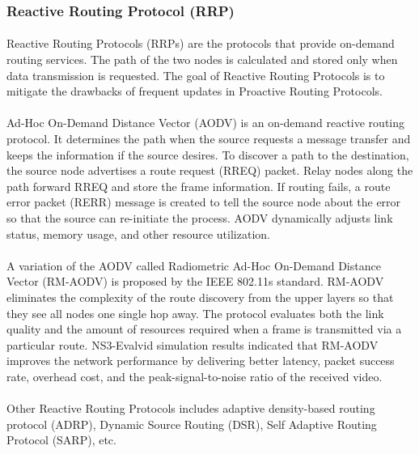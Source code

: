 \documentclass[a4paper,12pt]{report}
\begin{document}
\subsubsection{Reactive Routing Protocol (RRP)}
\paragraph{}
Reactive Routing Protocols (RRPs) are the protocols that provide on-demand routing services. The path of the two nodes is calculated and stored only when data transmission is requested. The goal of Reactive Routing Protocols is to mitigate the drawbacks of frequent updates in Proactive Routing Protocols.

\paragraph{}
Ad-Hoc On-Demand Distance Vector (AODV) is an on-demand reactive routing protocol. It determines the path when the source requests a message transfer and keeps the information if the source desires. To discover a path to the destination, the source node advertises a route request (RREQ) packet. Relay nodes along the path forward RREQ and store the frame information\cite{maurya2012overview}. If routing fails, a route error packet (RERR) message is created to tell the source node about the error so that the source can re-initiate the process. AODV dynamically adjusts link status, memory usage, and other resource utilization\cite{maurya2012overview}.

\paragraph{}
A variation of the AODV called Radiometric Ad-Hoc On-Demand Distance Vector (RM-AODV) is proposed by the IEEE 802.11s standard\cite{topobased}. RM-AODV eliminates the complexity of the route discovery from the upper layers so that they see all nodes one single hop away\cite{topobased}. The protocol evaluates both the link quality and the amount of resources required when a frame is transmitted via a particular route. NS3-Evalvid simulation results indicated that RM-AODV improves the network performance by delivering better latency, packet success rate, overhead cost, and the peak-signal-to-noise ratio of the received video\cite{katila2017routing}.

\paragraph{}
Other Reactive Routing Protocols includes adaptive density-based routing protocol (ADRP)\cite{zheng2017adaptive}, Dynamic Source Routing (DSR)\cite{alshabtat2011low}, Self Adaptive Routing Protocol (SARP)\cite{elwhishi2009sarp}, etc.
\end{document}
